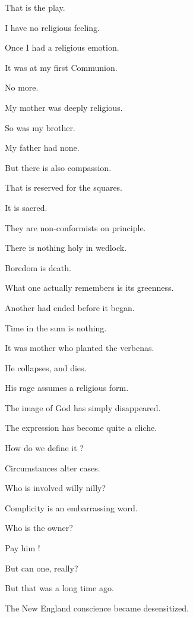 That is the play. 

I have no religious feeling. 

Once I had a religious emotion. 

It was at my first Communion. 

No more. 

My mother was deeply religious. 

So was my brother. 

My father had none. 

But there is also compassion. 

That is reserved for the squares. 

It is sacred. 

They are non-conformists on principle. 

There is nothing holy in wedlock. 

Boredom is death. 

What one actually remembers is its greenness. 

Another had ended before it began. 

Time in the sum is nothing. 

It was mother who planted the verbenas. 

He collapses, and dies. 

His rage assumes a religious form.

The image of God has simply disappeared. 

The expression has become quite a cliche.

How do we define it ?

Circumstances alter cases. 

Who is involved willy nilly?

Complicity is an embarrassing word. 

Who is the owner?

Pay him !

But can one, really?

But that was a long time ago.

The New England conscience became desensitized.




